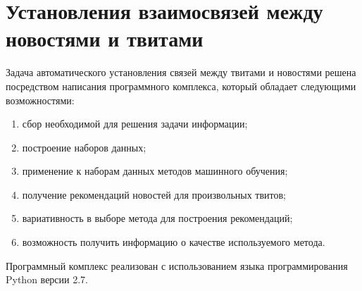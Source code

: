 \section{Установления взаимосвязей между новостями и твитами}
    Задача автоматического установления связей между твитами и новостями решена посредством написания программного комплекса,
    который обладает следующими возможностями:
    \begin{enumerate}
        \item сбор необходимой для решения задачи информации;
        \item построение наборов данных;
        \item применение к наборам данных методов машинного обучения;
        \item получение рекомендаций новостей для произвольных твитов;
        \item вариативность в выборе метода для построения рекомендаций;
        \item возможность получить информацию о качестве используемого метода.
    \end{enumerate}
    Программный комплекс реализован с использованием языка программирования Python версии 2.7.


    
    
    
    
    

